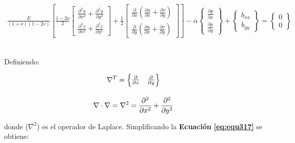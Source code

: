 \begin{ceqn} %
\begin{gather}\label{eq:equ317}
\frac{E}{(1+\nu)(1-2\nu)}
\left[\frac{1-2\nu}{2}
\begin{bmatrix}
       \frac{\partial^2 u}{\partial x^2} + \frac{\partial^2 u}{\partial y^2}\\[1em]
       \frac{\partial^2 v}{\partial x^2} + \frac{\partial^2 v}{\partial y^2}
\end{bmatrix}
+\frac{1}{2}
\begin{bmatrix}
       \frac{\partial}{\partial x}\left(\frac{\partial u}{\partial x} + \frac{\partial v}{\partial y}\right)\\[1em]
       \frac{\partial}{\partial y}\left(\frac{\partial u}{\partial x} + \frac{\partial v}{\partial y}\right)
\end{bmatrix}
\right] - \alpha\begin{Bmatrix}  
\frac{\partial p}{ \partial x}\\[1em]
\frac{\partial p}{ \partial y}
\end{Bmatrix}
+ \begin{Bmatrix} b_{xx} \\[1em] b_{yy} \end{Bmatrix} = \begin{Bmatrix} 0 \\[1em] 0 \end{Bmatrix}
\end{gather}   
\end{ceqn}
\\
Definiendo:

\begin{ceqn} 
\begin{subequations} \label{eq:equ318} 
\begin{gather}
\normalsize{\nabla^T = \begin{Bmatrix} \frac{\partial}{\partial x} & \frac{\partial}{\partial y}\end{Bmatrix}} \label{eq:equ318a}\\[10pt]
\normalsize{\nabla \cdot \nabla = \nabla^2 = \frac{\partial^2}{\partial x^2} + \frac{\partial^2}{\partial y^2} } \label{eq:equ318b}
\end{gather}  
\end{subequations} 
\end{ceqn}
donde ($\nabla^2$) es el operador de Laplace. Simplificando la \textbf{Ecuación} \textbf{\ref{eq:equ317}} se obtiene:

